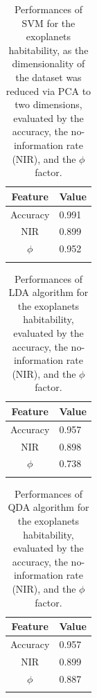 \documentclass[
12pt, %
a4paper, %
oneside, %
headinclude,footinclude, %
BCOR5mm, %
]{scrartcl}
\begin{document}
\begin{table}[]
\caption{Performances of SVM for the exoplanets habitability, as the dimensionality of the dataset was reduced via PCA to two dimensions, evaluated by the accuracy, the no-information rate (NIR), and the $\phi$ factor.}
\begin{center}
\begin{tabular}{l|l}
\multicolumn{1}{c|}{Feature} & Value \\ \hline
\multicolumn{1}{c|}{Accuracy} & 0.991 \\ \hline
\multicolumn{1}{c|}{NIR} & 0.899 \\ \hline
\multicolumn{1}{c|}{$\phi$} & 0.952 \\ 
\label{SVM+PCA_perf_tab}
\end{tabular}
\end{center}
\end{table}

\begin{table}[]
\caption{Performances of LDA algorithm for the exoplanets habitability, evaluated by the accuracy, the no-information rate (NIR), and the $\phi$ factor.}
\begin{center}
\begin{tabular}{l|l}
\multicolumn{1}{c|}{Feature} & Value \\ \hline
\multicolumn{1}{c|}{Accuracy} & 0.957 \\ \hline
\multicolumn{1}{c|}{NIR} & 0.898 \\ \hline
\multicolumn{1}{c|}{$\phi$} & 0.738 \\ 
\label{LDA_perf_tab}
\end{tabular}
\end{center}
\end{table}

\begin{table}[]
\caption{Performances of QDA algorithm for the exoplanets habitability, evaluated by the accuracy, the no-information rate (NIR), and the $\phi$ factor.}
\begin{center}
\begin{tabular}{l|l}
\multicolumn{1}{c|}{Feature} & Value \\ \hline
\multicolumn{1}{c|}{Accuracy} & 0.957 \\ \hline
\multicolumn{1}{c|}{NIR} & 0.899 \\ \hline
\multicolumn{1}{c|}{$\phi$} & 0.887 \\ 
\label{QDA_perf_tab}
\end{tabular}
\end{center}
\end{table}
\end{document}
